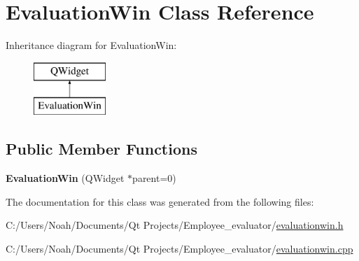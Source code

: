 \hypertarget{class_evaluation_win}{\section{Evaluation\-Win Class Reference}
\label{class_evaluation_win}
}
Inheritance diagram for Evaluation\-Win\-:\begin{figure}[H]
\begin{center}
\leavevmode
\includegraphics[height=2.000000cm]{class_evaluation_win}
\end{center}
\end{figure}
\subsection*{Public Member Functions}
\begin{DoxyCompactItemize}
\item 
\hypertarget{class_evaluation_win_adc63eca24f260a9bccfb5d3ba28c27d8}{{\bfseries Evaluation\-Win} (Q\-Widget $\ast$parent=0)}\label{class_evaluation_win_adc63eca24f260a9bccfb5d3ba28c27d8}

\end{DoxyCompactItemize}


The documentation for this class was generated from the following files\-:\begin{DoxyCompactItemize}
\item 
C\-:/\-Users/\-Noah/\-Documents/\-Qt Projects/\-Employee\-\_\-evaluator/\hyperlink{evaluationwin_8h}{evaluationwin.\-h}\item 
C\-:/\-Users/\-Noah/\-Documents/\-Qt Projects/\-Employee\-\_\-evaluator/\hyperlink{evaluationwin_8cpp}{evaluationwin.\-cpp}\end{DoxyCompactItemize}
